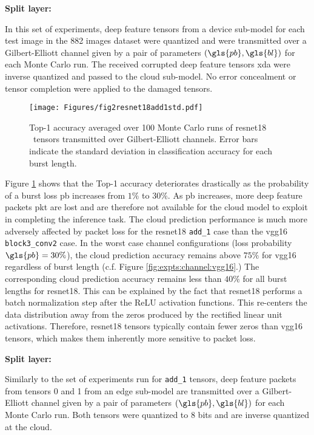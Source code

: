 \textbf{Split layer:} \addone

In this set of experiments, deep feature tensors from a device sub-model for each test image in the 882 images dataset were quantized and were transmitted over a Gilbert-Elliott channel given by a pair of parameters $(\gls{pb},\gls{bl})$ for each Monte Carlo run. The received corrupted deep feature tensors \gls{xda} were inverse quantized and passed to the cloud sub-model. No error concealment or tensor completion were applied to the damaged tensors.

\begin{figure}[H]
	\centering 
	\texttt{[image: Figures/fig2resnet18add1std.pdf]}
	\caption[Prediction accuracy with ResNet18 add 1 tensors transmitted over Gilbert-Elliott channels]{Top-1 accuracy averaged over 100 Monte Carlo runs of \gls{resnet18} \addone~tensors transmitted over Gilbert-Elliott channels. Error bars indicate the standard deviation in classification accuracy for each burst length.} \label{fig:expts:channel:add1}
\end{figure}

Figure \ref{fig:expts:channel:add1} shows that the Top-1 accuracy deteriorates drastically as the probability of a burst loss \gls{pb} increases from $1\%$ to $30\%$. As \gls{pb} increases, more deep feature packets \gls{pkt} are lost and are therefore not available for the cloud model to exploit in completing the inference task. The cloud prediction performance is much more adversely affected by packet loss for the \gls{resnet18} \verb|add_1| case than the \gls{vgg16} \verb|block3_conv2| case. In the worst case channel configurations (loss probability $\gls{pb}=30\%$), the cloud prediction accuracy remains above $75\%$ for \gls{vgg16} regardless of burst length (c.f. Figure \ref{fig:expts:channel:vgg16}.) The corresponding cloud prediction accuracy remains less than $40\%$ for all burst lengths for \gls{resnet18}. This can be explained by the fact that \gls{resnet18} performs a batch normalization step after the ReLU activation functions. This re-centers the data distribution away from the zeros produced by the rectified linear unit activations. Therefore, \gls{resnet18} tensors typically contain fewer zeros than \gls{vgg16} tensors, which makes them inherently more sensitive to packet loss.

\textbf{Split layer:} \soneunitonerelutwo 

Similarly to the set of experiments run for \verb|add_1| tensors, deep feature packets from tensors 0 and 1 from an edge sub-model are transmitted over a Gilbert-Elliott channel given by a pair of parameters $(\gls{pb},\gls{bl})$ for each Monte Carlo run. Both tensors were quantized to 8 bits and are inverse quantized at the cloud.

